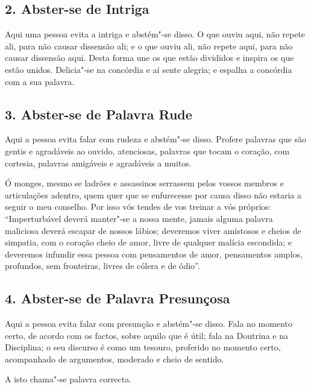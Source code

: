\subsection{2. Abster-se de Intriga}

Aqui uma pessoa evita a intriga e abstém"-se disso. O que ouviu aqui, não repete
ali, para não causar dissensão ali; e o que ouviu ali, não repete aqui, para não
causar dissensão aqui. Desta forma une os que estão divididos e inspira os que
estão unidos. Delicia"-se na concórdia e aí sente alegria; e espalha a concórdia
com a sua palavra.

\subsection{3. Abster-se de Palavra Rude}

Aqui a pessoa evita falar com rudeza e abstém"-se disso. Profere palavras que são
gentis e agradáveis ao ouvido, atenciosas, palavras que tocam o coração, com
cortesia, palavras amigáveis e agradáveis a muitos.



Ó monges, mesmo se ladrões e assassinos serrassem pelos vossos membros e articulações adentro, quem quer que se enfurecesse por causa disso não estaria a seguir o meu conselho. Por isso vós tendes de vos treinar a vós próprios: “Imperturbável deverá manter"-se a nossa mente, jamais alguma palavra maliciosa deverá escapar de nossos lábios; deveremos viver amistosos e cheios de simpatia, com o coração cheio de amor, livre de qualquer malícia escondida; e deveremos infundir essa pessoa com pensamentos de amor, pensamentos amplos, profundos, sem fronteiras, livres de cólera e de ódio”.


\subsection{4. Abster-se de Palavra Presunçosa}

Aqui a pessoa evita falar com presunção e abstém"-se disso. Fala no momento
certo, de acordo com os factos, sobre aquilo que é útil; fala na Doutrina e na
Disciplina; o seu discurso é como um tesouro, proferido no momento certo,
acompanhado de argumentos, moderado e cheio de sentido.

A isto chama"-se palavra correcta.

